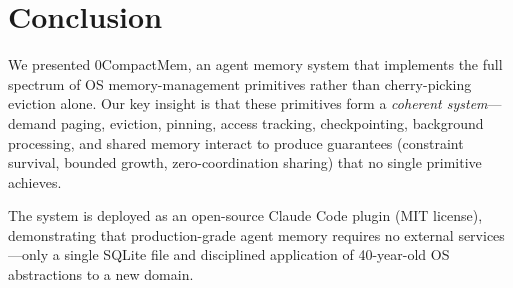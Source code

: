 \documentclass[10pt,twocolumn]{article}
\begin{document}
\section{Conclusion}
\label{sec:conclusion}

We presented 0CompactMem, an agent memory system that implements the full spectrum of OS memory-management primitives rather than cherry-picking eviction alone. Our key insight is that these primitives form a \emph{coherent system}---demand paging, eviction, pinning, access tracking, checkpointing, background processing, and shared memory interact to produce guarantees (constraint survival, bounded growth, zero-coordination sharing) that no single primitive achieves.

The system is deployed as an open-source Claude Code plugin (MIT license), demonstrating that production-grade agent memory requires no external services---only a single SQLite file and disciplined application of 40-year-old OS abstractions to a new domain.



\end{document}
